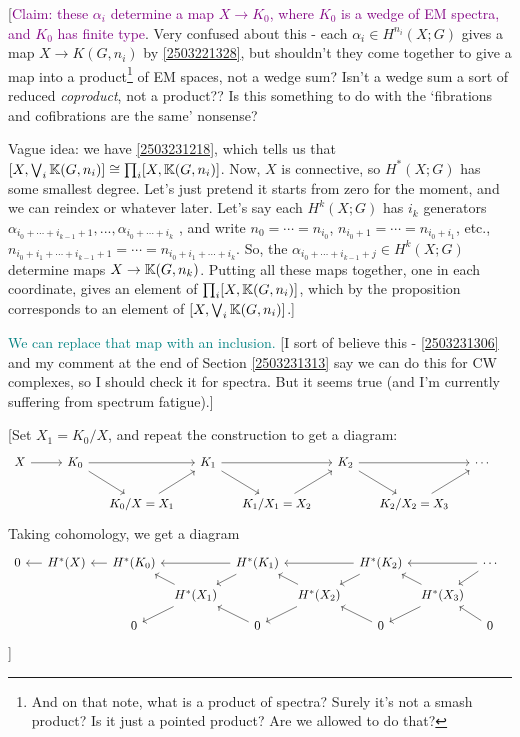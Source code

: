 \documentclass{MetricNotes2023}
\def\bb{\ensuremath\mathbb}
\def\textcolour{\textcolor}
\begin{document}
[\textcolour{purple}{Claim: these \(\alpha_i\) determine a map \(X \to K_0\), where \(K_0\) is a wedge of EM spectra, and \(K_0\) has finite type}. Very confused about this - each \(\alpha_i\in H^{n_i}(X;G)\) gives a map \(X \to K(G,n_i)\) by \ref{2503221328}, but shouldn't they  come together to give a map into a product\footnote{And on that note, what is a product of spectra? Surely it's not a smash product? Is it just a pointed product? Are we allowed to do that?} of EM spaces, not a wedge sum? Isn't a wedge sum a sort of reduced \textit{coproduct}, not a product?? Is this something to do with the `fibrations and cofibrations are the same' nonsense?

Vague idea: we have \ref{2503231218}, which tells us that \([X, \bigvee_i \bb{K}(G,n_i)]\cong \prod_i[X, \bb{K}(G,n_i)]\). Now, \(X\) is connective, so \(H^*(X;G)\) has some smallest degree. Let's just pretend it starts from zero for the moment, and we can reindex or whatever later. Let's say each \(H^k(X;G)\) has \(i_k\) generators \(\alpha_{i_0+\cdots+i_{k-1}+1}, ...,\alpha_{i_0+\cdots+i_k}\)  , and write \(n_0=\cdots=n_{i_0}\), \(n_{i_0+1}=\cdots= n_{i_0+i_1}\), etc., \(n_{i_0+i_1+\cdots+i_{k-1}+1}=\cdots = n_{i_0+i_1+\cdots+i_k}\). So, the \(\alpha_{i_0+\cdots+i_{k-1}+j}\in H^k(X;G)\) determine maps \(X\to \bb{K}(G,n_k)\). Putting all these maps together, one in each coordinate, gives an element of \(\prod_i[X, \bb{K}(G,n_i)]\), which by the proposition corresponds to an element of \([X, \bigvee_i \bb{K}(G,n_i)]\).] 

\textcolour{teal}{We can replace that map with an inclusion.} [I sort of believe this - \ref{2503231306} and my comment at the end of Section \ref{2503231313} say we can do this for CW complexes, so I should check it for spectra. But it seems true (and I'm currently suffering from spectrum fatigue).]

[Set \(X_1=K_0/X\), and repeat the construction to get a diagram:
\begin{equation}\label{2503301114}
\begin{tikzcd}[column sep=3ex] 
 X \arrow[rr, ""]  & & K_0 \arrow[rr, ""] \arrow[dr, ""] & & K_1 \arrow[dr, ""] \arrow[rr, ""] & & K_2 \arrow[dr, ""] \arrow[rr, ""] & & \cdots \\ 
  &&& K_0/X=X_1 \arrow[ur, ""] & & K_1/X_1=X_2 \arrow[ur, ""] & & K_2/X_2=X_3 \arrow[ur, ""] &  &
 \end{tikzcd}\nonumber
\end{equation}
Taking cohomology, we get a diagram
\[\begin{tikzcd}[column sep=1.5ex, row sep = 2ex, arrows=<-]
 0 \arrow[rr, ""] && H^*(X) \arrow[rr,""] & & H^*(K_0) \arrow[rr, ""] \arrow[dr, ""] & & H^*(K_1) \arrow[dr, ""] \arrow[rr, ""] & & H^*(K_2) \arrow[dr, ""] \arrow[rr, ""] & & \cdots \\ 
  &&&&& H^*(X_1) \arrow[ur, ""] \arrow[dr] & & H^*(X_2) \arrow[ur, ""] \arrow[dr] & & H^*(X_3) \arrow[ur, ""] \arrow[dr] &  &\\
&&&& 0 \arrow[ur] && 0 \arrow[ur] && 0 \arrow[ur] && 0
 \end{tikzcd}\] 
]
\end{document}
